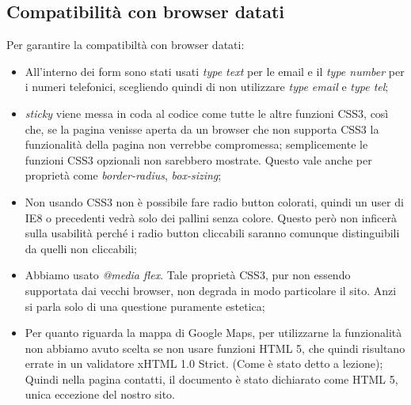 \subsection{Compatibilità con browser datati}
Per garantire la compatibiltà con browser datati:
\begin{itemize}
\item All’interno dei form sono stati usati \textit{type text} per le email e il \textit{type number} per i numeri telefonici, scegliendo quindi di non utilizzare \textit{type email} e \textit{type tel};
\item \textit{sticky} viene messa in coda al codice come tutte le altre funzioni CSS3,  così che, se la pagina venisse aperta da un browser che non supporta CSS3 la funzionalità della pagina non verrebbe compromessa; semplicemente le funzioni CSS3 opzionali non sarebbero mostrate. Questo vale anche per proprietà come \textit{border-radius}, \textit{box-sizing};
\item Non usando CSS3 non è possibile fare radio button colorati, quindi un user di IE8 o precedenti vedrà solo dei pallini senza colore. Questo però non inficerà sulla usabilità perché i radio button cliccabili saranno comunque distinguibili da quelli non cliccabili;
\item Abbiamo usato \textit{@media flex}. Tale proprietà CSS3, pur non essendo supportata dai vecchi browser, non degrada in modo particolare il sito. Anzi si parla solo di una questione puramente estetica;
\item Per quanto riguarda la mappa di Google Maps, per utilizzarne la funzionalità non abbiamo avuto scelta se non usare funzioni HTML 5, che quindi risultano errate in un validatore xHTML 1.0 Strict. (Come è stato detto a lezione);
Quindi nella pagina contatti, il documento è stato dichiarato come HTML 5, unica eccezione del nostro sito.
\end{itemize}


